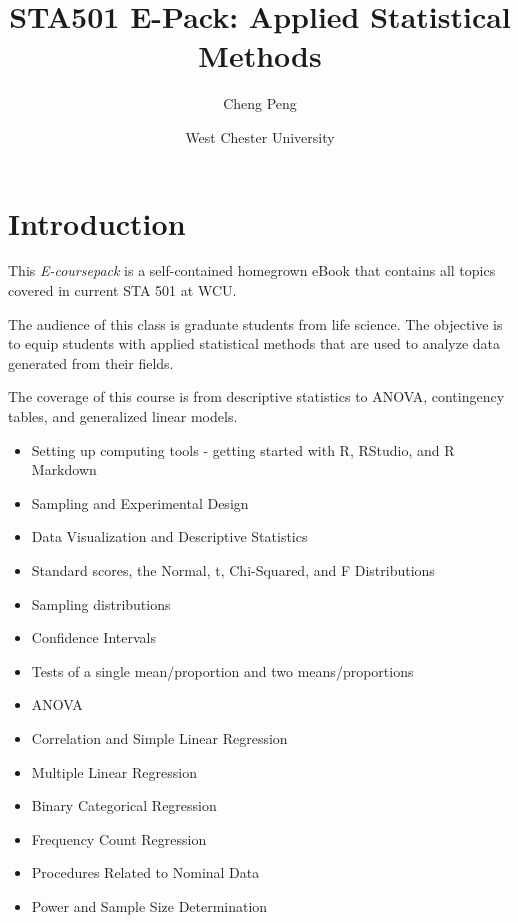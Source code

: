 \documentclass[
]{book}
\title{STA501 E-Pack: Applied Statistical Methods}
\author{Cheng Peng}
\date{West Chester University}
\providecommand{\tightlist}{%
  \setlength{\itemsep}{0pt}\setlength{\parskip}{0pt}}
\begin{document}
\maketitle

{
\setcounter{tocdepth}{1}
\tableofcontents
}
\hypertarget{introduction}{%
\chapter{Introduction}\label{introduction}}

This \emph{E-coursepack} is a self-contained homegrown eBook that contains all topics covered in current STA 501 at WCU.

The audience of this class is graduate students from life science. The objective is to equip students with applied statistical methods that are used to analyze data generated from their fields.

The coverage of this course is from descriptive statistics to ANOVA, contingency tables, and generalized linear models.

\begin{itemize}
\tightlist
\item
  Setting up computing tools - getting started with R, RStudio, and R Markdown
\item
  Sampling and Experimental Design\\
\item
  Data Visualization and Descriptive Statistics\\
\item
  Standard scores, the Normal, t, Chi-Squared, and F Distributions\\
\item
  Sampling distributions\\
\item
  Confidence Intervals\\
\item
  Tests of a single mean/proportion and two means/proportions\\
\item
  ANOVA\\
\item
  Correlation and Simple Linear Regression\\
\item
  Multiple Linear Regression\\
\item
  Binary Categorical Regression\\
\item
  Frequency Count Regression\\
\item
  Procedures Related to Nominal Data\\
\item
  Power and Sample Size Determination
\end{itemize}
\end{document}
